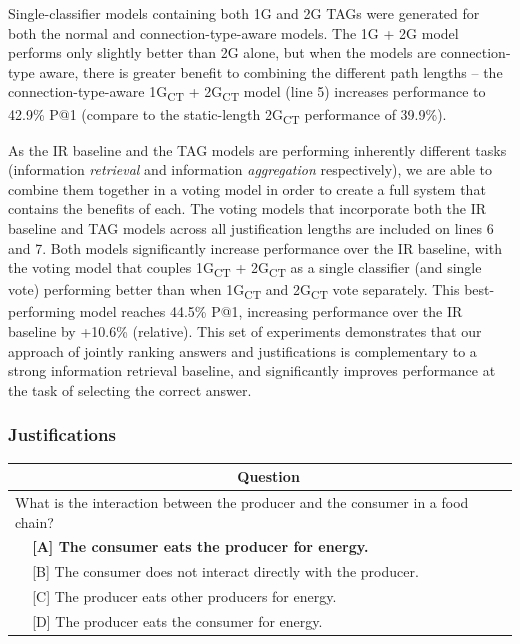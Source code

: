 {{} Single-classifier models containing both 1G and 2G TAGs were generated for both the normal and connection-type-aware models.  The 1G + 2G model performs only slightly better than 2G alone, but when the models are connection-type aware, there is greater benefit to combining the different path lengths -- the connection-type-aware 1G\textsubscript{CT} + 2G\textsubscript{CT} model (line 5) increases performance to 42.9\% P@1 (compare to the static-length 2G\textsubscript{CT} performance of 39.9\%).


As the IR baseline and the TAG models are performing inherently different tasks (information \emph{retrieval} and information \emph{aggregation} respectively), we are able to combine them together in a voting model in order to create a full system that contains the benefits of each.
The voting models that incorporate both the IR baseline and TAG models across all justification lengths are included on lines 6 and 7.  Both models significantly increase performance over the IR baseline, with the voting model that couples 1G\textsubscript{CT} + 2G\textsubscript{CT} as a single classifier (and single vote) performing better than when 1G\textsubscript{CT} and 2G\textsubscript{CT} vote separately.  This best-performing model reaches 44.5\% P@1, increasing performance over the IR baseline by +10.6\% (relative). %
This set of experiments demonstrates that our approach of jointly ranking answers and justifications is complementary to a strong information retrieval baseline, and significantly improves performance at the task of selecting the correct answer.  


\subsubsection{Justifications}


%
%
\begin{table}[t]
\begin{center}
\begin{footnotesize}
\begin{tabularx}{\textwidth}{p{1cm}p{11.5cm}}
\hline
\multicolumn{1}{c}{} & \multicolumn{1}{c}{Question} \\
\hline			
\multicolumn{2}{l}{	What is the interaction between the producer and the consumer in a food chain?} \\
		&	\textbf{[A] The consumer eats the producer for energy.}  \\
		&  [B] The consumer does not interact directly with the producer. \\
			&   [C] The producer eats other producers for energy.   \\
			& [D] The producer eats the consumer for energy. \\


\end{tabularx}
\end{footnotesize}
\end{center}
\end{table}}
